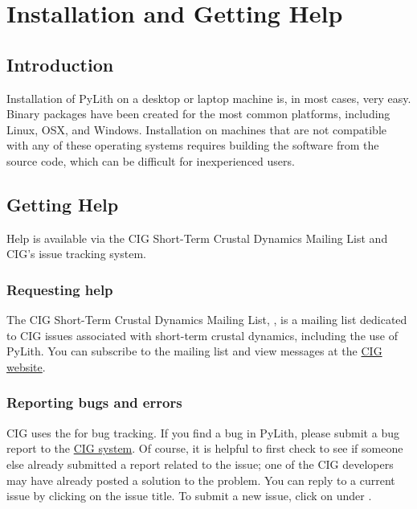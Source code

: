 \chapter{Installation and Getting Help}

\section{Introduction}

Installation of PyLith on a desktop or laptop machine is, in most
cases, very easy. Binary packages have been created for the most
common platforms, including Linux, OSX, and Windows. Installation on
machines that are not compatible with any of these operating systems
requires building the software from the source code, which can be
difficult for inexperienced users.

\section{Getting Help}

Help is available via the CIG Short-Term Crustal Dynamics Mailing List
and CIG's issue tracking system.

\subsection{Requesting help}

The CIG Short-Term Crustal Dynamics Mailing List,
, is a mailing list dedicated to CIG
issues associated with short-term crustal dynamics, including the use
of PyLith. You can subscribe to the mailing list and view messages at
the \href{http://www.geodynamics.org}{CIG website}.

\subsection{Reporting bugs and errors}

CIG uses the  for bug tracking. If you find a bug
in PyLith, please submit a bug report to the
\href{http://www.geodynamics.org/roundup}{CIG 
  system}. Of course, it is helpful to first check to see if someone
else already submitted a report related to the issue; one of the CIG
developers may have already posted a solution to the problem. You can
reply to a current issue by clicking on the issue title. To submit a
new issue, click on  under .

